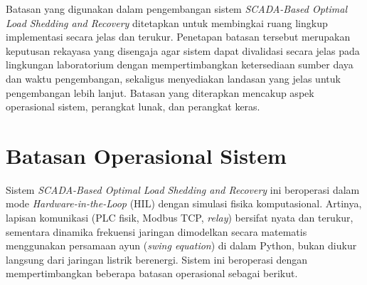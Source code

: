 Batasan yang digunakan dalam pengembangan sistem \textit{SCADA-Based Optimal Load Shedding and Recovery} ditetapkan untuk membingkai ruang lingkup implementasi secara jelas dan terukur. Penetapan batasan tersebut merupakan keputusan rekayasa yang disengaja agar sistem dapat divalidasi secara jelas pada lingkungan laboratorium dengan mempertimbangkan ketersediaan sumber daya dan waktu pengembangan, sekaligus menyediakan landasan yang jelas untuk pengembangan lebih lanjut. Batasan yang diterapkan mencakup aspek operasional sistem, perangkat lunak, dan perangkat keras.

\section{Batasan Operasional Sistem}
\label{sec:Batasan_Operasional_Sistem}

Sistem \textit{SCADA-Based Optimal Load Shedding and Recovery} ini beroperasi dalam mode \textit{Hardware-in-the-Loop} (HIL) dengan simulasi fisika komputasional. Artinya, lapisan komunikasi (PLC fisik, Modbus TCP, \textit{relay}) bersifat nyata dan terukur, sementara dinamika frekuensi jaringan dimodelkan secara matematis menggunakan persamaan ayun (\textit{swing equation}) di dalam Python, bukan diukur langsung dari jaringan listrik berenergi. Sistem ini beroperasi dengan mempertimbangkan beberapa batasan operasional sebagai berikut.

